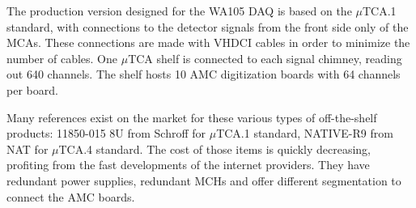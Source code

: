 The production version designed for the WA105 DAQ is based on the
$\mu$TCA.1 standard, with connections to the detector signals from the
front side only of the MCAs. These connections are made with VHDCI
cables in order to minimize the number of cables. One $\mu$TCA shelf
is connected to each signal chimney, reading out 640 channels.  The
shelf hosts 10 AMC digitization boards with 64 channels per board.


Many references exist on the market for these various types of off-the-shelf products:
11850-015 8U from Schroff for $\mu$TCA.1 standard, NATIVE-R9 from NAT
for $\mu$TCA.4 standard. The cost of those items is quickly
decreasing, profiting from the fast developments of the internet
providers. They have redundant power supplies, redundant MCHs and
offer different segmentation to connect the AMC boards.



